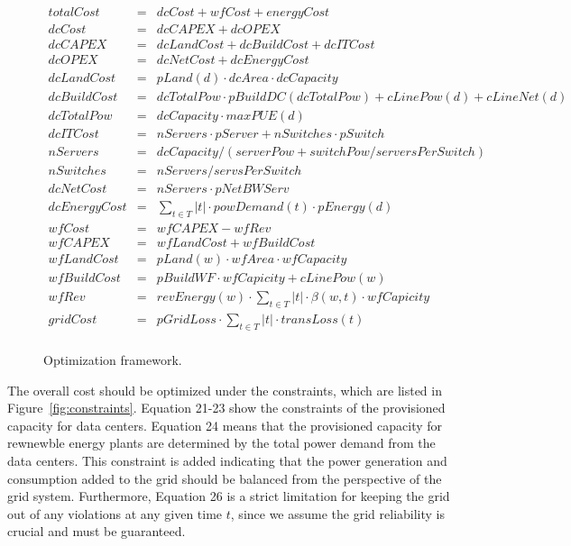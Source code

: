 \begin{figure*}
\begin{eqnarray}
	totalCost & = & dcCost + wfCost + energyCost \\
	dcCost & = & dcCAPEX + dcOPEX \\
        dcCAPEX & = & dcLandCost + dcBuildCost + dcITCost \\
        dcOPEX & = & dcNetCost + dcEnergyCost \\
        dcLandCost & = & pLand(d) \cdot dcArea \cdot dcCapacity \\
        dcBuildCost & = & dcTotalPow \cdot pBuildDC(dcTotalPow) +
            cLinePow(d) + cLineNet(d) \\
        dcTotalPow & = & dcCapacity \cdot maxPUE(d) \\
        dcITCost & = & nServers \cdot pServer + nSwitches \cdot
            pSwitch \\
        nServers & = & dcCapacity / (serverPow + switchPow / serversPerSwitch)\\
        nSwitches & = & nServers / servsPerSwitch\\
        dcNetCost & = & nServers \cdot pNetBWServ \\
        dcEnergyCost & = & \sum_{t \in T} {|t| \cdot powDemand(t) \cdot pEnergy(d) } \\
 	wfCost & = & wfCAPEX - wfRev  \\
        wfCAPEX & = & wfLandCost + wfBuildCost \\
        wfLandCost & = & pLand(w) \cdot wfArea \cdot wfCapacity \\
        wfBuildCost & = & pBuildWF \cdot wfCapicity + cLinePow(w) \\
        wfRev & = & revEnergy(w) \cdot  \sum_{t \in T}{ |t| \cdot
            \beta(w,t) \cdot wfCapicity } \\
        gridCost & = & pGridLoss \cdot \sum_{t \in T}{ |t| \cdot transLoss(t)} \\%
\end{eqnarray}
\caption{Optimization framework.}
\label{fig:optimization}
\end{figure*}

The overall cost should be optimized under the constraints, which are listed in Figure~\ref{fig:constraints}. Equation 21-23 show the constraints of the provisioned capacity for data centers. Equation 24 means that the provisioned capacity for rewnewble energy plants are determined by the total power demand from the data centers. This constraint is added indicating that the power generation and consumption added to the grid should be balanced from the perspective of the grid system. Furthermore, Equation 26 
is a strict limitation for keeping the grid out of any violations at any given time $t$, since we assume the grid reliability is crucial and must be guaranteed.

